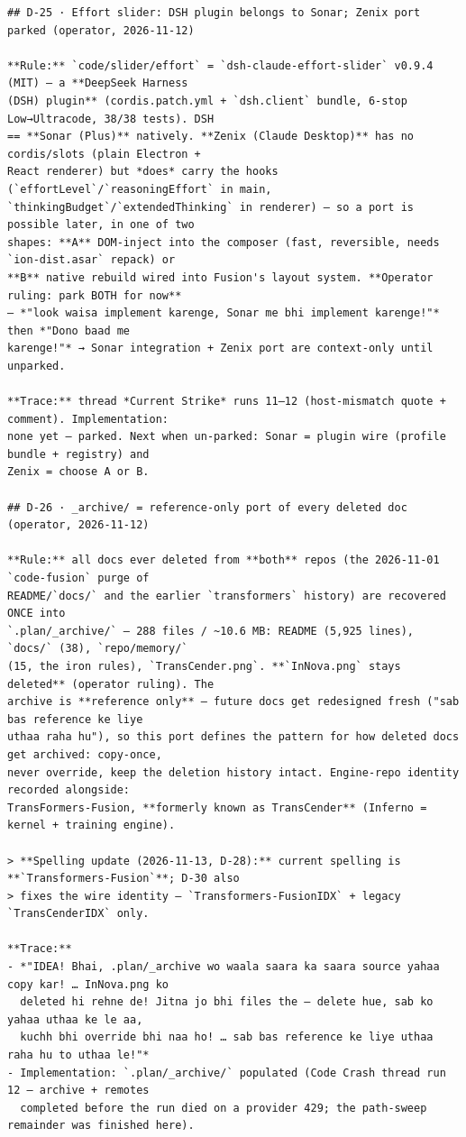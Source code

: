 \begin{verbatim}
## D-25 · Effort slider: DSH plugin belongs to Sonar; Zenix port parked (operator, 2026-11-12)

**Rule:** `code/slider/effort` = `dsh-claude-effort-slider` v0.9.4 (MIT) — a **DeepSeek Harness
(DSH) plugin** (cordis.patch.yml + `dsh.client` bundle, 6-stop Low→Ultracode, 38/38 tests). DSH
== **Sonar (Plus)** natively. **Zenix (Claude Desktop)** has no cordis/slots (plain Electron +
React renderer) but *does* carry the hooks (`effortLevel`/`reasoningEffort` in main,
`thinkingBudget`/`extendedThinking` in renderer) — so a port is possible later, in one of two
shapes: **A** DOM-inject into the composer (fast, reversible, needs `ion-dist.asar` repack) or
**B** native rebuild wired into Fusion's layout system. **Operator ruling: park BOTH for now**
— *"look waisa implement karenge, Sonar me bhi implement karenge!"* then *"Dono baad me
karenge!"* → Sonar integration + Zenix port are context-only until unparked.

**Trace:** thread *Current Strike* runs 11–12 (host-mismatch quote + comment). Implementation:
none yet — parked. Next when un-parked: Sonar = plugin wire (profile bundle + registry) and
Zenix = choose A or B.

## D-26 · _archive/ = reference-only port of every deleted doc (operator, 2026-11-12)

**Rule:** all docs ever deleted from **both** repos (the 2026-11-01 `code-fusion` purge of
README/`docs/` and the earlier `transformers` history) are recovered ONCE into
`.plan/_archive/` — 288 files / ~10.6 MB: README (5,925 lines), `docs/` (38), `repo/memory/`
(15, the iron rules), `TransCender.png`. **`InNova.png` stays deleted** (operator ruling). The
archive is **reference only** — future docs get redesigned fresh ("sab bas reference ke liye
uthaa raha hu"), so this port defines the pattern for how deleted docs get archived: copy-once,
never override, keep the deletion history intact. Engine-repo identity recorded alongside:
TransFormers-Fusion, **formerly known as TransCender** (Inferno = kernel + training engine).

> **Spelling update (2026-11-13, D-28):** current spelling is **`Transformers-Fusion`**; D-30 also
> fixes the wire identity — `Transformers-FusionIDX` + legacy `TransCenderIDX` only.

**Trace:**
- *"IDEA! Bhai, .plan/_archive wo waala saara ka saara source yahaa copy kar! … InNova.png ko
  deleted hi rehne de! Jitna jo bhi files the — delete hue, sab ko yahaa uthaa ke le aa,
  kuchh bhi override bhi naa ho! … sab bas reference ke liye uthaa raha hu to uthaa le!"*
- Implementation: `.plan/_archive/` populated (Code Crash thread run 12 — archive + remotes
  completed before the run died on a provider 429; the path-sweep remainder was finished here).



\end{verbatim}
